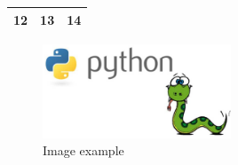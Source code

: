 \documentclass{article}
\begin{document}
\begin{tabular}{|c|c|c|}
\hline
12&13&14 \\
\hline
\end{tabular}
\begin{figure}
\centering
\includegraphics[width=0.5\textwidth]{image.jpg}
\caption{Image example}
\label{fig:example}
\end{figure}
\end{document}
